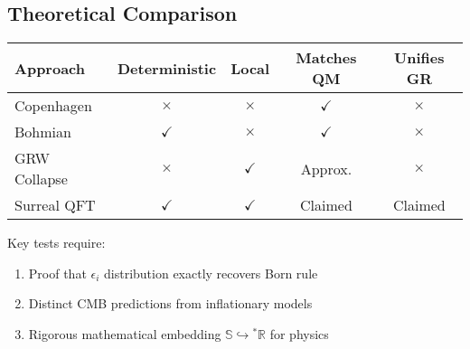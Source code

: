 \subsection*{Theoretical Comparison}
\begin{center}
\begin{tabular}{lcccc}
\hline
\textbf{Approach} & \textbf{Deterministic} & \textbf{Local} & \textbf{Matches QM} & \textbf{Unifies GR} \\
\hline
Copenhagen & $\times$ & $\times$ & $\checkmark$ & $\times$ \\
Bohmian & $\checkmark$ & $\times$ & $\checkmark$ & $\times$ \\
GRW Collapse & $\times$ & $\checkmark$ & Approx. & $\times$ \\
Surreal QFT & $\checkmark$ & $\checkmark$ & Claimed & Claimed \\
\hline
\end{tabular}
\end{center}

\noindent Key tests require:
\begin{enumerate}
\item Proof that $\epsilon_i$ distribution exactly recovers Born rule
\item Distinct CMB predictions from inflationary models
\item Rigorous mathematical embedding $\mathbb{S} \hookrightarrow {}^*\mathbb{R}$ for physics
\end{enumerate}